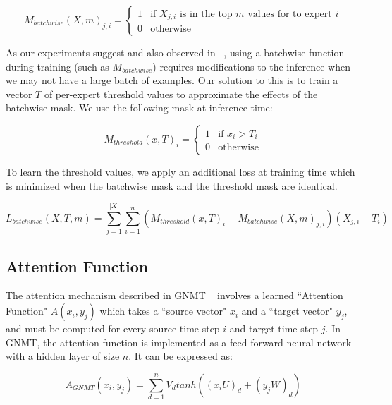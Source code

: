 \documentclass{article}
\begin{document}
\begin{equation}\label{eq:batchwisetop_k}
M_{batchwise}(X, m)_{j,i} = \begin{cases}
            1 & \text{if $X_{j,i}$ is in the top $m$ values for to expert $i$} \\
            0 & \text{otherwise}
        \end{cases}
\end{equation}

As our experiments suggest and also observed in ~\citep{DBLP:journals/corr/IoffeS15}, using a batchwise function during training (such as $M_{batchwise}$) requires modifications to the inference when we may not have a large batch of examples. Our solution to this is to train a vector $T$ of per-expert threshold values to approximate the effects of the batchwise mask.  We use the following mask at inference time:

\begin{equation}\label{eq:threshold}
M_{threshold}(x, T)_i = \begin{cases}
            1 & \text{if $x_i > T_i$} \\
            0 & \text{otherwise}
        \end{cases}
\end{equation}

To learn the threshold values, we apply an additional loss at training time which is minimized when the batchwise mask and the threshold mask are identical.

\begin{equation}\label{eq:thresholdloss}
L_{batchwise}(X, T, m) = \sum_{j = 1}^{|X|} \sum_{i=1}^n 
(M_{threshold}(x, T)_i - M_{batchwise}(X, m)_{j,i}) (X_{j, i} - T_i)
\end{equation}

\subsection{Attention Function}\label{sec:attention} 

The attention mechanism described in GNMT ~\citep{GNMT} involves a learned ``Attention Function" $A(x_i,y_j)$ which takes a ``source vector" $x_i$ and a ``target vector" $y_j$, and must be computed for every source time step $i$ and target time step $j$.  In GNMT, the attention function is implemented as a feed forward neural network with a hidden layer of size $n$.  It can be expressed as:

\begin{equation}\label{eq:gnmtattention}
A_{GNMT}(x_i, y_j) = \sum_{d=1}^{n}V_d tanh((x_iU)_d + (y_jW)_d)
\end{equation}
\end{document}
